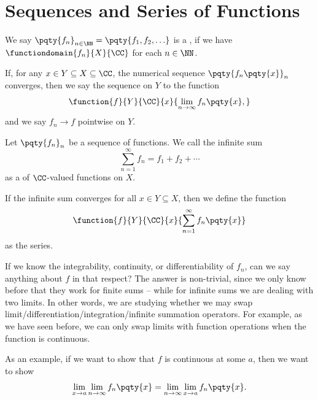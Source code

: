 \section{Sequences and Series of Functions}

\begin{definition}
    \label{def:seq-of-fn}%
    We say \(\pqty{f_n}_{n \in \NN} = \pqty{f_1, f_2, \ldots}\) is a , if we have \(\functiondomain{f_n}{X}{\CC}\) for each \(n \in \NN\).
\end{definition}

\begin{definition}
    \label{def:pointwise-convergence}%
    If, for any \(x \in Y \subseteq X \subseteq \CC\), the numerical sequence \(\pqty{f_n \pqty{x}}_{n}\) converges, then we say the sequence  on \(Y\) to the function
    \[
        \function{f}{Y}{\CC}{x}{\lim_{n \to \infty} f_n \pqty{x},}
    \]
    and we say \(f_n \to f\) pointwise on \(Y\).
\end{definition}

\begin{definition}
    \label{def:series-of-functions}%
    Let \(\pqty{f_n}_{n}\) be a sequence of functions. We call the infinite sum
    \[
        \sum_{n = 1}^{\infty} f_n = f_1 + f_2 + \cdots
    \]
    as a  of \(\CC\)-valued functions on \(X\).

    If the infinite sum converges for all \(x \in Y \subseteq X\), then we define the function
    \[
        \function{f}{Y}{\CC}{x}{\sum_{n = 1}^{\infty} f_n \pqty{x}}
    \]
    as the series.
\end{definition}

If we know the integrability, continuity, or differentiability of \(f_n\), can we say anything about \(f\) in that respect? The answer is non-trivial, since we only know before that they work for finite sums -- while for infinite sums we are dealing with two limits. In other words, we are studying whether we may swap limit/differentiation/integration/infinite summation operators. For example, as we have seen before, we can only swap limits with function operations when the function is continuous.

As an example, if we want to show that \(f\) is continuous at some \(a\), then we want to show
\[
    \lim_{x \to a} \lim_{n \to \infty} f_n \pqty{x} = \lim_{n \to \infty} \lim_{x \to a} f_n \pqty{x}.
\]


